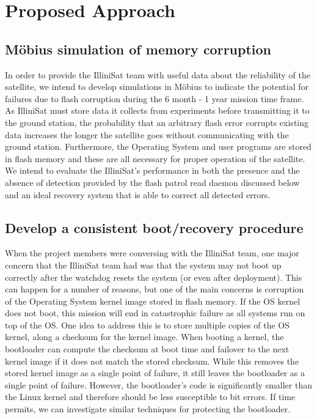 \section{Proposed Approach}
\subsection{M\"obius simulation of memory corruption}
In order to provide the IlliniSat team with useful data about the reliability of
the satellite, we intend to develop simulations in M\"obius to indicate the
potential for failures due to flash corruption during the 6 month - 1 year
mission time frame.  As IlliniSat must store data it collects from experiments
before transmitting it to the ground station, the probability that an arbitrary
flash error corrupts existing data increases the longer the satellite goes
without communicating with the ground station.  Furthermore, the Operating
System and user programs are stored in flash memory and these are all necessary
for proper operation of the satellite.  We intend to evaluate the IlliniSat's
performance in both the presence and the absence of detection provided by the flash patrol read daemon discussed below and an ideal recovery system that is able to correct all detected errors.

\subsection{Develop a consistent boot/recovery procedure}
When the project members were conversing with the IlliniSat team, one major
concern that the IlliniSat team had was that the system may not boot up
correctly after the watchdog resets the system (or even after deployment).  This
can happen for a number of reasons, but one of the main concerns is corruption
of the Operating System kernel image stored in flash memory.  If the OS kernel
does not boot, this mission will end in catastrophic failure as all systems run
on top of the OS.  One idea to address this is to store multiple copies of the
OS kernel, along a checksum for the kernel image.  When booting a kernel, the
bootloader can compute the checksum at boot time and failover to the next kernel
image if it does not match the stored checksum.  While this removes the stored
kernel image as a single point of failure, it still leaves the bootloader as a
single point of failure.  However, the bootloader's code is significantly
smaller than the Linux kernel and therefore should be less susceptible to bit
errors.  If time permits, we can investigate similar techniques for protecting
the bootloader. 

